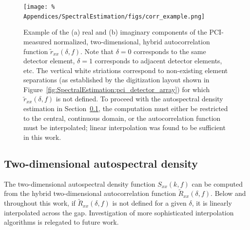 \begin{figure}
  \centering
  \texttt{[image: \%
    Appendices/SpectralEstimation/figs/corr\_example.png]}
  \caption[Normalized, $2$d, hybrid autocorrelation function]{%
    Example of the (a) real and (b) imaginary components
    of the PCI-measured normalized, two-dimensional, hybrid
    autocorrelation function $\tilde{r}_{xx}(\delta, f)$.
    Note that $\delta = 0$ corresponds to the same detector element,
    $\delta = 1$ corresponds to adjacent detector elements, etc.
    The vertical white striations correspond to
    non-existing element separations
    (as established by the digitization layout shown in
    Figure~\ref{fig:SpectralEstimation:pci_detector_array})
    for which $\tilde{r}_{xx}(\delta, f)$ is not defined.
    To proceed with the autospectral density estimation
    in Section~\ref{app:SpectralEstimation:2d_spectra:2d_spectra},
    the computation must either be restricted
    to the central, continuous domain, or
    the autocorrelation function must be interpolated;
    linear interpolation was found to be sufficient in this work.
  }
  \label{fig:SpectralEstimation:corr_example}
\end{figure}


\subsection{Two-dimensional autospectral density}
\label{app:SpectralEstimation:2d_spectra:2d_spectra}
The two-dimensional autospectral density function
$S_{xx}(k, f)$ can be computed from
the hybrid two-dimensional autocorrelation function
$\tilde{R}_{xx}(\delta, f)$.
Below and throughout this work,
if $\tilde{R}_{xx}(\delta, f)$ is not defined for a given $\delta$,
it is linearly interpolated across the gap.
Investigation of more sophisticated interpolation algorithms
is relegated to future work.

